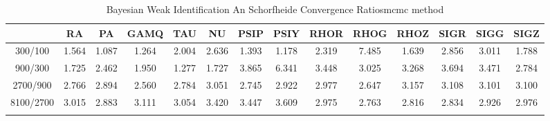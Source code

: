 \documentclass[a4paper,10pt]{article}
\begin{document}
\centering
\begin{longtable}{cccccccccccccc}
\toprule
 & RA & PA & GAMQ & TAU & NU & PSIP & PSIY & RHOR & RHOG & RHOZ & SIGR & SIGG & SIGZ \\
\midrule
300/100 & 1.564 & 1.087 & 1.264 & 2.004 & 2.636 & 1.393 & 1.178 & 2.319 & 7.485 & 1.639 & 2.856 & 3.011 & 1.788 \\
900/300 & 1.725 & 2.462 & 1.950 & 1.277 & 1.727 & 3.865 & 6.341 & 3.448 & 3.025 & 3.268 & 3.694 & 3.471 & 2.784 \\
2700/900 & 2.766 & 2.894 & 2.560 & 2.784 & 3.051 & 2.745 & 2.922 & 2.977 & 2.647 & 3.157 & 3.108 & 3.101 & 3.100 \\
8100/2700 & 3.015 & 2.883 & 3.111 & 3.054 & 3.420 & 3.447 & 3.609 & 2.975 & 2.763 & 2.816 & 2.834 & 2.926 & 2.976 \\
\bottomrule
\caption{Bayesian Weak Identification An Schorfheide Convergence Ratiosmcmc method}
\label{table:tbl:WeakAnSchoConvergenceRatios_mcmc}
\end{longtable}
\end{document}
